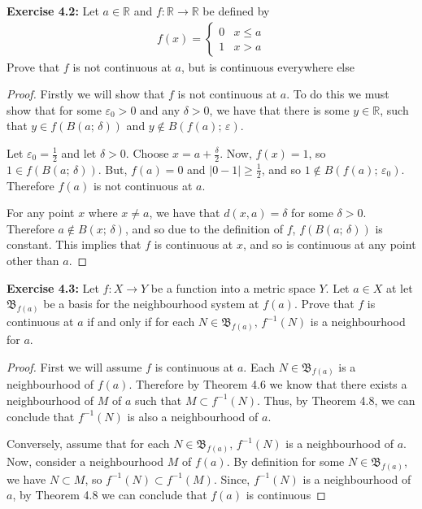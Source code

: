 \documentclass{article}
\begin{document}
\textbf{Exercise 4.2:} Let $a \in \mathbb{R}$ and $f: \mathbb{R} \to \mathbb{R}$ be defined by
\begin{align*}
    f(x) = \begin{cases} 
      0 & x \le a \\
      1 & x > a
   \end{cases}
\end{align*}
Prove that $f$ is not continuous at $a$, but is continuous everywhere else
\begin{proof}
    Firstly we will show that $f$ is not continuous at $a$. To do this we must show that for some $\varepsilon_0 > 0$ and any $\delta > 0$,
    we have that there is some $y \in \mathbb{R}$, such that $y \in f(B(a;\,\delta))$ and $y \notin B(f(a);\,\varepsilon)$.

    Let $\varepsilon_0 = \frac{1}{2}$ and let $\delta > 0$. Choose $x = a + \frac{\delta}{2}$. Now, $f(x) = 1$, so $1 \in f(B(a;\,\delta))$.
    But, $f(a) = 0$ and $\left|0 - 1\right| \ge \frac{1}{2}$, and so $1 \notin B(f(a);\,\varepsilon_0)$. Therefore $f(a)$ is not continuous at $a$.

    For any point $x$ where $x \ne a$, we have that $d(x, a) = \delta$ for some $\delta > 0$. Therefore $a \notin B(x;\,\delta)$,
    and so due to the definition of $f$, $f(B(a;\,\delta))$ is constant. This implies that $f$ is continuous at $x$, and so is
    continuous at any point other than $a$.
\end{proof}

\textbf{Exercise 4.3:} Let $f: X \to Y$ be a function into a metric space $Y$. Let $a \in X$ at let $\mathfrak{B}_{f(a)}$ be a basis for
the neighbourhood system at $f(a)$. Prove that $f$ is continuous at $a$ if and only if for each $N \in \mathfrak{B}_{f(a)},\,f^{-1}(N)$ is
a neighbourhood for $a$.

\begin{proof}
    First we will assume $f$ is continuous at $a$. Each $N \in \mathfrak{B}_{f(a)}$ is a neighbourhood of $f(a)$. Therefore by Theorem 4.6 we know that there exists a neighbourhood of $M$ of $a$ such that
    $M \subset f^{-1}(N)$. Thus, by Theorem 4.8, we can conclude that $f^{-1}(N)$ is also a neighbourhood of $a$.

    Conversely, assume that for each $N \in \mathfrak{B}_{f(a)},\,f^{-1}(N)$ is a neighbourhood of $a$. Now, consider a neighbourhood $M$ of
    $f(a)$. By definition for some $N \in \mathfrak{B}_{f(a)}$, we have $N \subset M$, so $f^{-1}(N) \subset f^{-1}(M)$. Since, $f^{-1}(N)$
    is a neighbourhood of $a$, by Theorem 4.8 we can conclude that $f(a)$ is continuous
\end{proof}
\end{document}
